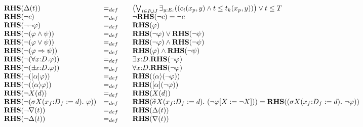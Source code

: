 \documentclass{article}
\begin{document}
\begin{equation*}
\begin{array}{lll}
{\mathbf{RHS}}(\Delta (t)) & =_{def} & \left( \bigvee_{i{\in }I\cup
J}\exists _{y{:}E_{i}}((c_{i}(x_{p},y)\wedge t\leq t_{k}(x_{p},y))\right)
\vee t\leq T \\
{\mathbf{RHS}}(\lnot c) & =_{def} & \lnot {\mathbf{RHS}}(\lnot c)=\lnot c \\
{\mathbf{RHS}}(\lnot \lnot \varphi ) & =_{def} & \mathbf{RHS}(\varphi ) \\
{\mathbf{RHS}}(\lnot (\varphi \wedge \psi )) & =_{def} & {\mathbf{RHS}}%
(\lnot \varphi )\vee {\mathbf{RHS}}(\lnot \psi ) \\
{\mathbf{RHS}}(\lnot (\varphi \vee \psi )) & =_{def} & {\mathbf{RHS}}(\lnot
\varphi )\wedge {\mathbf{RHS}}(\lnot \psi ) \\
{\mathbf{RHS}}(\lnot (\varphi \Rightarrow \psi )) & =_{def} & {\mathbf{RHS}}%
(\varphi )\wedge {\mathbf{RHS}}(\lnot \psi ) \\
{\mathbf{RHS}}(\lnot (\forall {x{:}D}.\varphi )) & =_{def} & \exists {x{:}D}.%
{\mathbf{RHS}}(\lnot \varphi ) \\
{\mathbf{RHS}}(\lnot (\exists {x{:}D}.\varphi )) & =_{def} & \forall {x{:}D}.%
{\mathbf{RHS}}(\lnot \varphi ) \\
{\mathbf{RHS}}(\lnot ([\alpha ]\varphi )) & =_{def} & {\mathbf{RHS}}(\langle
\alpha \rangle (\lnot \varphi )) \\
{\mathbf{RHS}}(\lnot (\langle \alpha \rangle \varphi )) & =_{def} & {\mathbf{%
RHS}}([\alpha ](\lnot \varphi )) \\
{\mathbf{RHS}}(\lnot X(d)) & =_{def} & {\mathbf{RHS}}(X(d)) \\
{\mathbf{RHS}}(\lnot (\sigma X(x_{f}{:}D_{f}:=d).~\varphi )) & =_{def}~~~ & {%
\mathbf{RHS}}(\widetilde{\sigma }X(x_{f}{:}D_{f}:=d).~(\lnot \varphi \lbrack
X:=\lnot X]))={\mathbf{RHS}}((\sigma X(x_{f}{:}D_{f}:=d).~\lnot \varphi ))
\\
{\mathbf{RHS}}(\lnot \nabla (t)) & =_{def} & {\mathbf{RHS}}(\Delta (t)) \\
{\mathbf{RHS}}(\lnot \Delta (t)) & =_{def} & {\mathbf{RHS}}(\nabla (t))%
\end{array}%
\end{equation*}

\pagebreak
\end{document}
